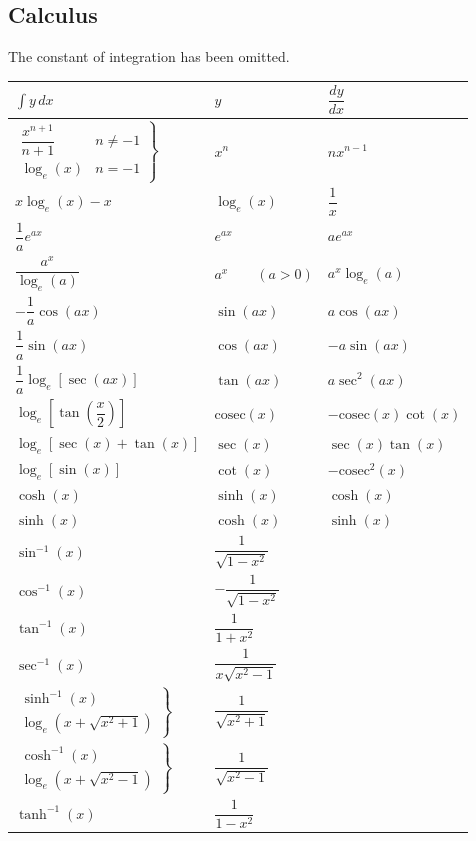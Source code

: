 \subsection{Calculus}
The constant of integration has been omitted.
\renewcommand{\arraystretch}{1.75}
\begin{center}
  \begin{tabular*}{\columnwidth}{@{\extracolsep{\fill}} lll }
    \toprule \toprule
    $\displaystyle \int y \, dx$ & $y$ & $\dfrac{dy}{dx}$\\
    \midrule
    $\left. \begin{array}{cl} \dfrac{x^{n+1}}{n+1} & n \neq -1 \\
    \log_e(x) & n = -1 \end{array} \right\}$ & $x^n$ & $nx^{n-1}$ \\
    $x \log_e(x) - x$ & $\log_e(x)$ & $\dfrac{1}{x}$ \\
    $\dfrac{1}{a}e^{ax} $ & $e^{ax}$ & $ae^{ax}$ \\
    $\dfrac{a^x}{\log_e(a)}$ & $a^x \qquad (a>0)$ & $a^x \log_e(a)$ \\
    $-\dfrac{1}{a}\cos(ax) $ & $\sin(ax)$ & $a\cos(ax)$ \\
    $\dfrac{1}{a}\sin(ax) $ & $\cos(ax)$ & $-a\sin(ax)$ \\
    $\dfrac{1}{a}\log_e[ \sec(ax)]$ & $\tan(ax)$ & $a\sec ^2(ax)$ \\
    $\log_e\left[ \tan\left(\dfrac{x}{2}\right)\right] $ & $\mbox{cosec}(x)$ & $-\mbox{cosec}(x)\cot(x)$ \\
    $\log_e[\sec(x) + \tan(x)] $ & $\sec(x)$ & $\sec(x)\tan(x)$ \\
    $\log_e[\sin(x)]$ & $\cot(x)$ & $-\mbox{cosec}^2(x)$ \\
		$\cosh(x)$ & $\sinh(x)$ & $\cosh(x)$ \\
    $\sinh(x)$ & $\cosh(x)$ & $\sinh(x)$ \\
    $\sin^{-1}(x)$ & $\dfrac{1}{\sqrt{1-x^2}}$ &\\
    $\cos^{-1}(x)$ & $-\dfrac{1}{\sqrt{1 - x^2}}$ \\
    $\tan^{-1}(x)$ & $\dfrac{1}{1+x^2}$ \\
    $\sec^{-1}(x)$ & $\dfrac{1}{x\sqrt{x^2 - 1}}$ & \\
    $\left. \begin{array}{c} \sinh^{-1}(x) \\ \log_e(x+\sqrt{x^2 + 1}) \end{array} \right\}$ & $\dfrac{1}{\sqrt{x^2 + 1}}$ & \\
    $\left. \begin{array}{c} \cosh^{-1}(x) \\ \log_e(x+\sqrt{x^2 - 1}) \end{array} \right\}$ & $\dfrac{1}{\sqrt{x^2 - 1}}$ & \\
    $\tanh^{-1}(x)$ & $\dfrac{1}{1-x^2}$ & \\
    \bottomrule  \bottomrule
  \end{tabular*}
\end{center}


